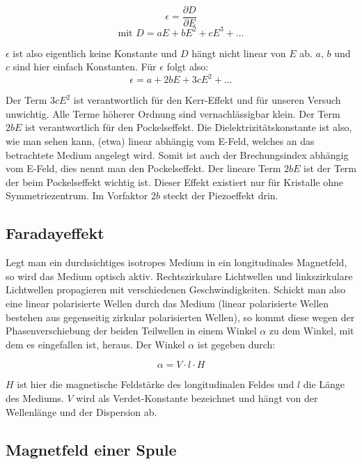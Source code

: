 \begin{equation} \epsilon = \frac{\partial D}{\partial E}  \end{equation}
\begin{equation} \text{mit \ } D = aE + bE^2 + cE^3 + \dots \end{equation}

$\epsilon$ ist also eigentlich keine Konstante und $D$ hängt nicht linear von $E$ ab. $a$, $b$ und $c$ sind hier einfach Konstanten. Für $\epsilon$ folgt also:
\begin{equation} \epsilon = a + 2bE + 3cE^2 + \dots \end{equation}

Der Term $3cE^2$ ist verantwortlich für den Kerr-Effekt und für unseren Versuch unwichtig. Alle Terme höherer Ordnung sind vernachlässigbar klein. Der Term $2bE$ ist verantwortlich für den Pockelseffekt. Die Dielektrizitätskonstante ist also, wie man sehen kann, (etwa) linear abhängig vom E-Feld, welches an das betrachtete Medium angelegt wird. Somit ist auch der Brechungsindex abhängig vom E-Feld, dies nennt man den Pockelseffekt. Der lineare Term $2bE$ ist der Term der beim Pockelseffekt wichtig ist. Dieser Effekt existiert nur für Kristalle ohne Symmetriezentrum. Im Vorfaktor $2b$ steckt der Piezoeffekt drin. 


\subsection{Faradayeffekt}

Legt man ein durchsichtiges isotropes Medium in ein longitudinales Magnetfeld, so wird das Medium optisch aktiv. Rechtszirkulare Lichtwellen und linkszirkulare Lichtwellen propagieren mit verschiedenen Geschwindigkeiten. Schickt man also eine linear polarisierte Wellen durch das Medium (linear polarisierte Wellen bestehen aus gegenseitig zirkular polarisierten Wellen), so kommt diese wegen der Phasenverschiebung der beiden Teilwellen in einem Winkel $\alpha$ zu dem Winkel, mit dem es eingefallen ist, heraus. Der Winkel $\alpha$ ist gegeben durch:

\begin{equation} \alpha = V\cdot l \cdot H \end{equation}

$H$ ist hier die magnetische Feldstärke des longitudinalen Feldes und $l$ die Länge des Mediums. $V$ wird als Verdet-Konstante bezeichnet und hängt von der Wellenlänge und der Dispersion ab.

\subsection{Magnetfeld einer Spule}

